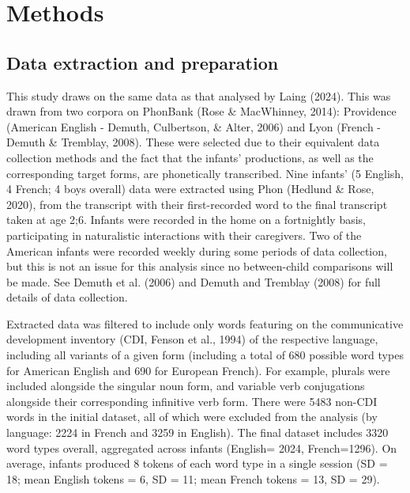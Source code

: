 \documentclass[
  man]{apa6}
\begin{document}
\section{Methods}\label{methods}

\subsection{Data extraction and preparation}\label{data-extraction-and-preparation}

This study draws on the same data as that analysed by Laing (2024). This was drawn from two corpora on PhonBank (Rose \& MacWhinney, 2014): Providence (American English - Demuth, Culbertson, \& Alter, 2006) and Lyon (French - Demuth \& Tremblay, 2008). These were selected due to their equivalent data collection methods and the fact that the infants' productions, as well as the corresponding target forms, are phonetically transcribed. Nine infants' (5 English, 4 French; 4 boys overall) data were extracted using Phon (Hedlund \& Rose, 2020), from the transcript with their first-recorded word to the final transcript taken at age 2;6. Infants were recorded in the home on a fortnightly basis, participating in naturalistic interactions with their caregivers. Two of the American infants were recorded weekly during some periods of data collection, but this is not an issue for this analysis since no between-child comparisons will be made. See Demuth et al. (2006) and Demuth and Tremblay (2008) for full details of data collection.

Extracted data was filtered to include only words featuring on the communicative development inventory (CDI, Fenson et al., 1994) of the respective language, including all variants of a given form (including a total of 680 possible word types for American English and 690 for European French). For example, plurals were included alongside the singular noun form, and variable verb conjugations alongside their corresponding infinitive verb form. There were 5483 non-CDI words in the initial dataset, all of which were excluded from the analysis (by language: 2224 in French and 3259 in English). The final dataset includes 3320 word types overall, aggregated across infants (English=
2024, French=1296). On average, infants produced 8 tokens of each word type in a single session (SD = 18; mean English tokens = 6, SD = 11; mean French tokens = 13, SD = 29).
\end{document}
